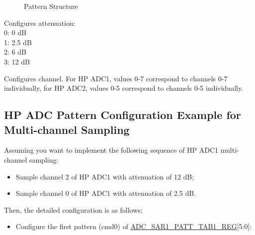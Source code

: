 \documentclass[main\_\_EN.tex]{subfiles}
\begin{document}
\begin{figure}[H]
\centering
{}%
%
\end{figure}
\vspace{-2em}
\begin{figure}[H]
    \centering
    \caption{Pattern Structure}
    \label{tab:pattern-table-register}
\end{figure}
\vspace{-2em}
\begin{regdesc}\begin{reglist}
\item [atten] Configures attenuation:\\
0: 0 dB\\
1: 2.5 dB\\
2: 6 dB\\
3: 12 dB
\item [ch\_sel] Configures channel. For HP ADC1, values 0-7 correspond to channels 0-7 individually, for HP ADC2, values 0-5 correspond to channels 0-5 individually.
\end{reglist}\end{regdesc}

\subsection{HP ADC Pattern Configuration Example for Multi-channel Sampling}

Assuming you want to implement the following sequence of HP ADC1 multi-channel sampling:

\begin{itemize}
    \item Sample channel 2 of HP ADC1 with attenuation of 12 dB;
    \item Sample channel 0 of HP ADC1 with attenuation of 2.5 dB.
\end{itemize}

Then, the detailed configuration is as follows:

\begin{itemize}
    \item Configure the first pattern (cmd0) of \hyperref[regdesc:ADCSAR1PATTTAB1REG]{ADC\_SAR1\_PATT\_TAB1\_REG}[5:0]:

    \centering
    \reglabel{}\regnewline%
    \begin{regdesc}\end{regdesc}
\end{itemize}
\end{document}
